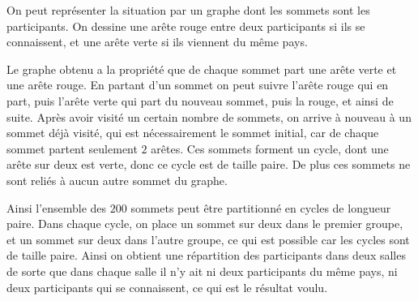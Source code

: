 \begin{sol}
On peut représenter la situation par un graphe dont les sommets sont les participants. On dessine une arête rouge entre deux participants si ils se connaissent, et une arête verte si ils viennent du même pays.

\medskip

Le graphe obtenu a la propriété que de chaque sommet part une arête verte et une arête rouge. En partant d'un sommet on peut suivre l'arête rouge qui en part, puis l'arête verte qui part du nouveau sommet, puis la rouge, et ainsi de suite. Après avoir visité un certain nombre de sommets, on arrive à nouveau à un sommet déjà visité, qui est nécessairement le sommet initial, car de chaque sommet partent seulement $2$ arêtes. Ces sommets forment un cycle, dont une arête sur deux est verte, donc ce cycle est de taille paire. De plus ces sommets ne sont reliés à aucun autre sommet du graphe.

\medskip

Ainsi l'ensemble des $200$ sommets peut être partitionné en cycles de longueur paire. Dans chaque cycle, on place un sommet sur deux dans le premier groupe, et un sommet sur deux dans l'autre groupe, ce qui est possible car les cycles sont de taille paire. Ainsi on obtient une répartition des participants dans deux salles de sorte que dans chaque salle il n'y ait ni deux participants du même pays, ni deux participants qui se connaissent, ce qui est le résultat voulu.
\end{sol}


